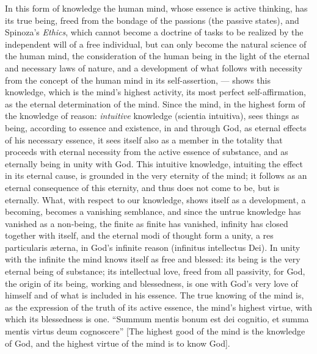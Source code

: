 In this form of knowledge the human mind, whose essence is active
thinking, has its true being, freed from the bondage of the passions
(the passive states), and Spinoza's \emph{Ethics}, which cannot become
a doctrine of tasks to be realized by the independent will of a free
individual, but can only become the natural science of the human mind,
the consideration of the human being in the light of the eternal and
necessary laws of nature, and a development of what follows with
necessity from the concept of the human mind in its self-assertion,
--- shows this knowledge, which is the mind's highest activity, its
most perfect self-affirmation, as the eternal determination of the
mind. Since the mind, in the highest form of the knowledge of reason:
\emph{intuitive} knowledge (scientia intuitiva), sees things as being,
according to essence and existence, in and through God, as eternal
effects of his necessary essence, it sees itself also as a member in
the totality that proceeds with eternal necessity from the active
essence of substance, and as eternally being in unity with God. This
intuitive knowledge, intuiting the effect in its eternal cause, is
grounded in the very eternity of the mind; it follows as an eternal
consequence of this eternity, and thus does not come to be, but is
eternally. What, with respect to our knowledge, shows itself as a
development, a becoming, becomes a vanishing semblance, and since the
untrue knowledge has vanished as a non-being, the finite as finite has
vanished, infinity has closed together with itself, and the eternal
modi of thought form a unity, a res particularis æterna, in God's
infinite reason (infinitus intellectus Dei). In unity with the
infinite the mind knows itself as free and blessed: its being is the
very eternal being of substance; its intellectual love, freed from all
passivity, for God, the origin of its being, working and blessedness,
is one with God's very love of himself and of what is
included in his essence. The true knowing of the mind is, as the
expression of the truth of its active essence, the mind's highest
virtue, with which its blessedness is one. ``Summum mentis bonum est
dei cognitio, et summa mentis virtus deum cognoscere'' [The highest
good of the mind is the knowledge of God, and the highest virtue of the
mind is to know God].

\divrule

